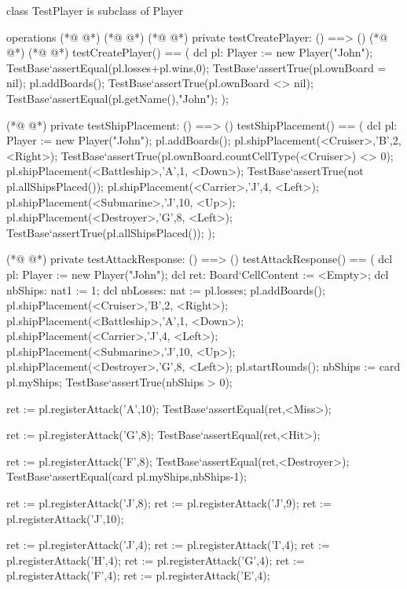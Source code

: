 \begin{vdmpp}[breaklines=true]
class TestPlayer is subclass of Player

operations
(*@
\label{createPlayer:4}
@*)
(*@
\label{testCreateGame:4}
@*)
(*@
\label{testCreatePlayer:4}
@*)
 private testCreatePlayer: () ==> ()
(*@
\label{run:5}
@*)
(*@
\label{testCreateBoard:5}
@*)
  testCreatePlayer() == (
  dcl pl: Player := new Player("John");
  TestBase`assertEqual(pl.losses+pl.wins,0);
  TestBase`assertTrue(pl.ownBoard = nil);
  pl.addBoards();
  TestBase`assertTrue(pl.ownBoard <> nil);
  TestBase`assertEqual(pl.getName(),"John");
 );
 
(*@
\label{testShipPlacement:14}
@*)
 private testShipPlacement: () ==> ()
  testShipPlacement() == (
  dcl pl: Player := new Player("John");
  pl.addBoards();
  pl.shipPlacement(<Cruiser>,'B',2, <Right>);
  TestBase`assertTrue(pl.ownBoard.countCellType(<Cruiser>) <> 0);
  pl.shipPlacement(<Battleship>,'A',1, <Down>);
  TestBase`assertTrue(not pl.allShipsPlaced());
  pl.shipPlacement(<Carrier>,'J',4, <Left>);
  pl.shipPlacement(<Submarine>,'J',10, <Up>);
  pl.shipPlacement(<Destroyer>,'G',8, <Left>);
  TestBase`assertTrue(pl.allShipsPlaced());
 );
 
(*@
\label{testAttackResponse:28}
@*)
 private testAttackResponse: () ==> ()
  testAttackResponse() == (
   dcl pl: Player := new Player("John");
   dcl ret: Board`CellContent := <Empty>;
   dcl nbShips: nat1 := 1;
   dcl nbLosses: nat := pl.losses;
   pl.addBoards();
   pl.shipPlacement(<Cruiser>,'B',2, <Right>);
   pl.shipPlacement(<Battleship>,'A',1, <Down>);
   pl.shipPlacement(<Carrier>,'J',4, <Left>);
   pl.shipPlacement(<Submarine>,'J',10, <Up>);
   pl.shipPlacement(<Destroyer>,'G',8, <Left>);
   pl.startRounds();
   nbShips := card pl.myShips;
   TestBase`assertTrue(nbShips > 0);
   
   ret := pl.registerAttack('A',10);
   TestBase`assertEqual(ret,<Miss>);
   
   ret := pl.registerAttack('G',8);
   TestBase`assertEqual(ret,<Hit>);
   
   ret := pl.registerAttack('F',8);
   TestBase`assertEqual(ret,<Destroyer>);
   TestBase`assertEqual(card pl.myShips,nbShips-1);
   
   ret := pl.registerAttack('J',8);
   ret := pl.registerAttack('J',9);
   ret := pl.registerAttack('J',10);
   
   ret := pl.registerAttack('J',4);
   ret := pl.registerAttack('I',4);
   ret := pl.registerAttack('H',4);
   ret := pl.registerAttack('G',4);
   ret := pl.registerAttack('F',4);
   ret := pl.registerAttack('E',4);
   

\end{vdmpp}
